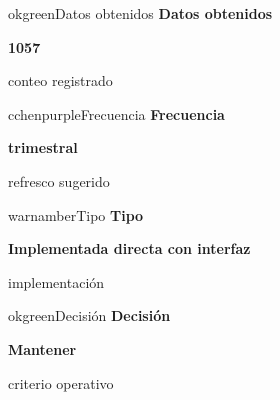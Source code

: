 \documentclass[9pt,a4paper]{extarticle}
\begin{document}
\vspace{0.04cm}
\begin{minipage}{0.24\textwidth}
\begin{metricbox}{okgreen}{Datos obtenidos}
{\large\bfseries Datos obtenidos}\par
{\Large\bfseries 1057}\par
{\normalsize conteo registrado}
\end{metricbox}
\end{minipage}\hfill
\begin{minipage}{0.24\textwidth}
\begin{metricbox}{cchenpurple}{Frecuencia}
{\large\bfseries Frecuencia}\par
{\large\bfseries trimestral}\par
{\normalsize refresco sugerido}
\end{metricbox}
\end{minipage}\hfill
\begin{minipage}{0.24\textwidth}
\begin{metricbox}{warnamber}{Tipo}
{\large\bfseries Tipo}\par
{\normalsize\bfseries Implementada directa con interfaz}\par
{\normalsize implementación}
\end{metricbox}
\end{minipage}\hfill
\begin{minipage}{0.24\textwidth}
\begin{metricbox}{okgreen}{Decisión}
{\large\bfseries Decisión}\par
{\normalsize\bfseries Mantener}\par
{\normalsize criterio operativo}
\end{metricbox}
\end{minipage}
\end{document}
